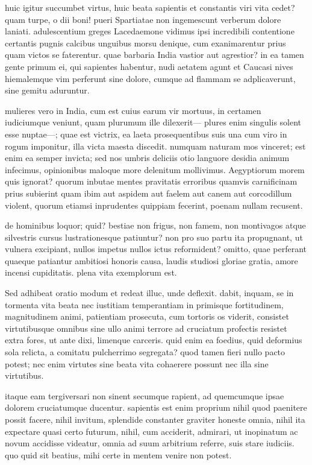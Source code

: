  huic igitur succumbet virtus, huic beata sapientis et constantis viri vita cedet? quam turpe, o dii boni! pueri Spartiatae non ingemescunt verberum dolore laniati. adulescentium greges Lacedaemone vidimus ipsi incredibili contentione certantis pugnis calcibus unguibus morsu denique, cum exanimarentur prius quam victos se faterentur. quae barbaria India vastior aut agrestior? in ea tamen gente primum ei, qui sapientes habentur, nudi aetatem agunt et Caucasi nives hiemalemque vim perferunt sine dolore, cumque ad flammam se adplicaverunt, sine gemitu aduruntur.

 mulieres vero in India, cum est cuius earum vir mortuus, in certamen iudiciumque veniunt, quam plurumum ille dilexerit— plures enim singulis solent esse nuptae—; quae est victrix, ea laeta prosequentibus suis una cum viro in rogum imponitur, illa victa maesta discedit. numquam naturam mos vinceret; est enim ea semper invicta; sed nos umbris deliciis otio languore desidia animum infecimus, opinionibus maloque more delenitum mollivimus. Aegyptiorum morem quis ignorat? quorum inbutae mentes pravitatis erroribus quamvis carnificinam prius subierint quam ibim aut aspidem aut faelem aut canem aut corcodillum violent, quorum etiamsi inprudentes quippiam fecerint, poenam nullam recusent.

 de hominibus loquor; quid? bestiae non frigus, non famem, non montivagos atque silvestris cursus lustrationesque patiuntur? non pro suo partu ita propugnant, ut vulnera excipiant, nullos impetus nullos ictus reformident? omitto, quae perferant quaeque patiantur ambitiosi honoris causa, laudis studiosi gloriae gratia, amore incensi cupiditatis. plena vita exemplorum est.

 Sed adhibeat oratio modum et redeat illuc, unde deflexit. dabit, inquam, se in tormenta vita beata nec iustitiam temperantiam in primisque fortitudinem, magnitudinem animi, patientiam prosecuta, cum tortoris os viderit, consistet virtutibusque omnibus sine ullo animi terrore ad cruciatum profectis resistet extra fores, ut ante dixi, limenque carceris. quid enim ea foedius, quid deformius sola relicta, a comitatu pulcherrimo segregata? quod tamen fieri nullo pacto potest; nec enim virtutes sine beata vita cohaerere possunt nec illa sine virtutibus.

 itaque eam tergiversari non sinent secumque rapient, ad quemcumque ipsae dolorem cruciatumque ducentur. sapientis est enim proprium nihil quod paenitere possit facere, nihil invitum, splendide constanter graviter honeste omnia, nihil ita expectare quasi certo futurum, nihil, cum acciderit, admirari, ut inopinatum ac novum accidisse videatur, omnia ad suum arbitrium referre, suis stare iudiciis. quo quid sit beatius, mihi certe in mentem venire non potest.

